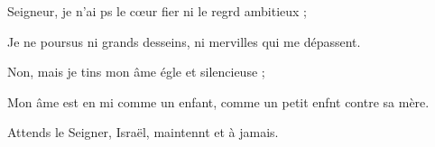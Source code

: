 \item Seigneur, je n’ai ps le cœur fier\psstar{} ni le regrd ambitieux ;
\item Je ne poursus ni grands desseins,\psstar{} ni mervilles qui me dépassent.
\item Non, mais je tins mon âme\psstar{} égle et silencieuse ; 
\item Mon âme est en mi comme un enfant,\psstar{} comme un petit enfnt contre sa mère.
\item Attends le Seigner, Israël,\psstar{} maintennt et à jamais.